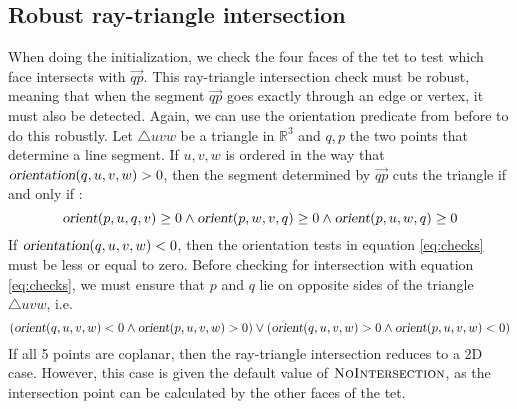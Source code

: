 \documentclass[../thesis.tex]{subfiles}
\begin{document}
\subsection{Robust ray-triangle intersection}
When doing the initialization, we check the four faces of the tet to test which face
intersects with $\Vec{qp}$. This ray-triangle intersection check must be robust, 
meaning that when the segment $\Vec{qp}$ goes exactly through an edge or vertex, it must also be detected.
Again, we can use the orientation predicate from before to do this robustly.
Let $\triangle uvw$ be a triangle in $\mathbb{R}^3$ and $q,p$ the two points
that determine a line segment. If $u,v,w$ is ordered in the way
that $\textsl{orientation}(q,u,v,w) > 0$, then the segment determined by $\Vec{qp}$
cuts the triangle if and only if \cite{segura}:
\begin{equation}\label{eq:checks}
  \op{orient}(p,u,q,v) \ge 0 \land \op{orient}(p,w,v,q) \ge 0 \land \op{orient}(p,u,w,q) \ge 0 
\end{equation}
If $\textsl{orientation}(q,u,v,w) < 0$, then the orientation tests in equation \ref{eq:checks}
must be less or equal to zero.
Before checking for intersection with equation \ref{eq:checks}, we must ensure that 
$p$ and $q$ lie on opposite sides of the triangle $\triangle uvw$, i.e.
\begin{equation}\label{eq:sides}
  (\op{orient}(q,u,v,w) < 0 \land \op{orient}(p,u,v,w) > 0)  \lor (\op{orient}(q,u,v,w) > 0 \land \op{orient}(p,u,v,w) < 0)  
\end{equation}
If all 5 points are coplanar, then the ray-triangle intersection reduces to a 2D case.
However, this case is given the default value of $\textsc{NoIntersection}$, as the
intersection point can be calculated by the other faces of the tet. 
\end{document}

